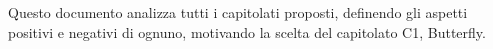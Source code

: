 Questo documento analizza tutti i capitolati proposti, definendo gli aspetti positivi e negativi
di ognuno, motivando la scelta del capitolato C1, Butterfly. 
